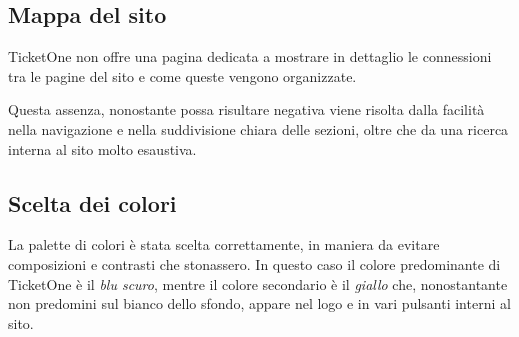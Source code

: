 \subsection{Mappa del sito}
	
	TicketOne non offre una pagina dedicata a mostrare in dettaglio le connessioni tra le pagine del sito e come queste vengono organizzate.
	\par Questa assenza, nonostante possa risultare negativa viene risolta dalla facilità nella navigazione e nella suddivisione chiara delle sezioni, oltre che da una ricerca interna al sito molto esaustiva.

\subsection{Scelta dei colori}
	
	La palette di colori è stata scelta correttamente, in maniera da evitare composizioni e contrasti che stonassero.
	In questo caso il colore predominante di TicketOne è il \textit{blu scuro}, mentre il colore secondario è il \textit{giallo} che, nonostantante non predomini sul bianco dello sfondo, appare nel logo e in vari pulsanti interni al sito.